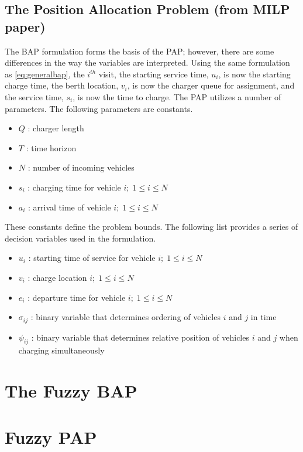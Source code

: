 \documentclass[11pt,a4paper,final]{article}
\begin{document}
\subsection{The Position Allocation Problem (from MILP paper)}
\label{sec:org5006d47}
The BAP formulation forms the basis of the PAP; however, there are some differences in the way the variables are
interpreted. Using the same formulation as \ref{eq:generalbap}, the \(i^{th}\) visit, the starting service time, \(u_i\), is now
the starting charge time, the berth location, \(v_i\), is now the charger queue for assignment, and the service time,
\(s_i\), is now the time to charge. The PAP utilizes a number of parameters. The following parameters are constants.

\begin{itemize}
\item \(Q\)   : charger length
\item \(T\)   : time horizon
\item \(N\)   : number of incoming vehicles
\item \(s_i\) : charging time for vehicle \(i;\; 1 \leq i \leq N\)
\item \(a_i\) : arrival time of vehicle \(i;\; 1 \leq i \leq N\)
\end{itemize}

These constants define the problem bounds. The following list provides a series of decision variables used in the
formulation.

\begin{itemize}
\item \(u_i\)         : starting time of service for vehicle \(i;\; 1 \leq i \leq N\)
\item \(v_i\)         : charge location \(i;\; 1 \leq i \leq N\)
\item \(e_i\)         : departure time for vehicle \(i;\; 1 \leq i \leq N\)
\item \(\sigma_{ij}\) : binary variable that determines ordering of vehicles \(i\) and \(j\) in time
\item \(\psi_{ij}\)   : binary variable that determines relative position of vehicles \(i\) and \(j\) when charging simultaneously
\end{itemize}

\section{The Fuzzy BAP}
\label{sec:orge04048b}

\section{Fuzzy PAP}
\label{sec:orgba6a7f9}
\end{document}
